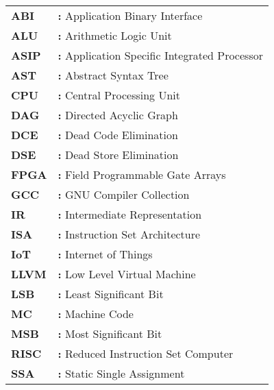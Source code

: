 \begin{tabular}{@{}p{2cm}l}
{\bf{ABI}} & {\bf:} Application Binary Interface\\
{\bf ALU} & {\bf:} Arithmetic Logic Unit\\
{\bf ASIP} & {\bf:} Application Specific Integrated Processor\\
{\bf AST} & {\bf:} Abstract Syntax Tree\\
{\bf CPU} & {\bf:} Central Processing Unit\\
{\bf DAG} & {\bf:} Directed Acyclic Graph\\
{\bf DCE} & {\bf:} Dead Code Elimination\\
{\bf DSE} & {\bf:} Dead Store Elimination\\
{\bf FPGA} & {\bf:} Field Programmable Gate Arrays\\
{\bf GCC} & {\bf:} GNU Compiler Collection\\
{\bf IR} & {\bf:} Intermediate Representation\\
{\bf ISA} & {\bf:} Instruction Set Architecture\\
{\bf IoT} & {\bf:} Internet of Things\\
{\bf LLVM} & {\bf:} Low Level Virtual Machine\\
{\bf LSB} & {\bf:} Least Significant Bit\\
{\bf MC} & {\bf:} Machine Code\\
{\bf MSB} & {\bf:} Most Significant Bit\\
{\bf RISC} & {\bf:} Reduced Instruction Set Computer\\
{\bf SSA} & {\bf:} Static Single Assignment\\
\end{tabular}

